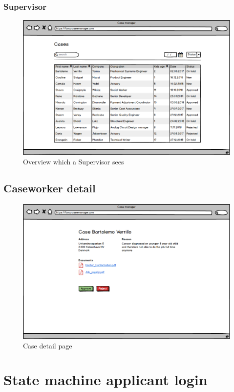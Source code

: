 \newpage
\subsubsection{Supervisor}
\begin{figure}[htb!]
    \centering
    \includegraphics[width=\textwidth]{img/page-supervisor-overview.png}
    \caption{Overview which a Supervisor sees}
\end{figure}

\newpage
\subsection{Caseworker detail}
\begin{figure}[htb!]
    \centering
    \includegraphics[width=\textwidth]{img/page-case-detail.png}
    \caption{Case detail page}
\end{figure}

\section{State machine applicant login}